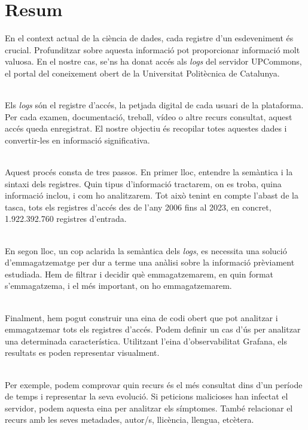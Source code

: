 \chapter*{Resum}\label{ch:abstract-ca}

En el context actual de la ciència de dades, cada registre d'un esdeveniment és crucial.
Profunditzar sobre aquesta informació pot proporcionar informació molt valuosa.
En el nostre cas, se'ns ha donat accés als \textit{logs} del servidor UPCommons, el portal del coneixement obert de la Universitat Politècnica de Catalunya.

\noindent \\
Els \textit{logs} són el registre d'accés, la petjada digital de cada usuari de la plataforma.
Per cada examen, documentació, treball, vídeo o altre recurs consultat, aquest accés queda enregistrat.
El nostre objectiu és recopilar totes aquestes dades i convertir-les en informació significativa.

\noindent \\
Aquest procés consta de tres passos.
En primer lloc, entendre la semàntica i la sintaxi dels registres.
Quin tipus d'informació tractarem, on es troba, quina informació inclou, i com ho analitzarem.
Tot això tenint en compte l'abast de la tasca, tots els registres d'accés des de l'any 2006 fins al 2023, en concret, 1.922.392.760 registres d'entrada.

\noindent \\
En segon lloc, un cop aclarida la semàntica dels \textit{logs}, es necessita una solució d'emmagatzematge per dur a terme una anàlisi sobre la informació prèviament estudiada.
Hem de filtrar i decidir què emmagatzemarem, en quin format s'emmagatzema, i el més important, on ho emmagatzemarem.

\noindent \\
Finalment, hem pogut construir una eina de codi obert que pot analitzar i emmagatzemar tots els registres d'accés.
Podem definir un cas d'ús per analitzar una determinada característica.
Utilitzant l'eina d'observabilitat Grafana, els resultats es poden representar visualment.

\noindent \\
Per exemple, podem comprovar quin recurs és el més consultat dins d'un període de temps i representar la seva evolució.
Si peticions malicioses han infectat el servidor, podem aquesta eina per analitzar els símptomes.
També relacionar el recurs amb les seves metadades, autor/s, llicència, llengua, etcètera.

